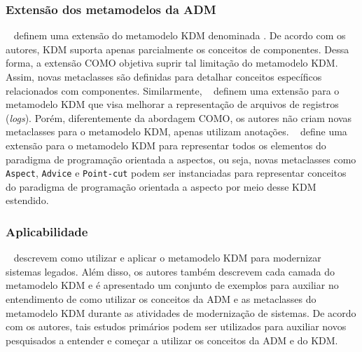 \subsubsection{Extensão dos metamodelos da ADM} %
\label{ssub:extension_of_adm_s_metamodels}

~ definem uma extensão do metamodelo KDM denominada . De acordo com os autores, KDM suporta apenas parcialmente os conceitos de componentes. Dessa forma, a extensão COMO objetiva suprir tal limitação do metamodelo KDM. Assim, novas metaclasses são definidas para detalhar conceitos específicos relacionados com componentes. Similarmente, ~ definem uma extensão para o metamodelo KDM que visa melhorar a representação de arquivos de registros (\textit{logs}). Porém, diferentemente da abordagem COMO, os autores não criam novas metaclasses para o metamodelo KDM, apenas utilizam anotações. ~ define uma extensão para o metamodelo KDM para representar todos os elementos do paradigma de programação orientada a aspectos, ou seja, novas metaclasses como \texttt{Aspect}, \texttt{Advice} e \texttt{Point-cut} podem ser instanciadas para representar conceitos do paradigma de programação orientada a aspecto por meio desse KDM estendido.


\subsubsection{Aplicabilidade} %
\label{ssub:applicability}


~ descrevem como utilizar e aplicar  o metamodelo KDM para modernizar sistemas legados. Além disso, os autores também descrevem cada camada do metamodelo KDM e é apresentado um conjunto de exemplos para auxiliar no entendimento de como utilizar os conceitos da ADM e as metaclasses do metamodelo KDM durante as atividades de modernização de sistemas. De acordo com os autores, tais estudos primários podem ser utilizados para auxiliar novos pesquisados a entender e começar a utilizar os conceitos da ADM e do KDM.


